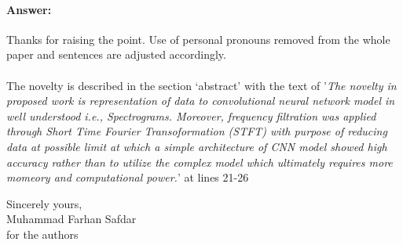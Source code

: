 \documentclass{article}
\begin{document}
\paragraph{Answer:}
Thanks for raising the point. Use of personal pronouns removed from the whole paper and sentences are adjusted accordingly. \\\\

The novelty is described in the section `abstract' with the text of '\textit{The novelty in proposed work is representation of data to convolutional neural network model in well understood i.e., Spectrograms. Moreover, frequency filtration was applied through Short Time Fourier Transoformation (STFT) with purpose of reducing data at possible limit at which a simple architecture of CNN model showed high accuracy rather than to utilize the complex model which ultimately requires more momeory and computational power.}' at lines 21-26

\vspace{0.5cm}

Sincerely yours,\\
Muhammad Farhan Safdar\\
for the authors
\end{document}
